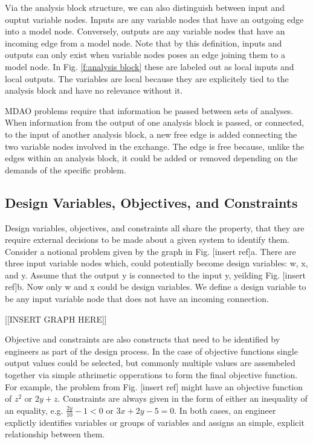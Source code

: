 Via the analysis block structure, we can also distinguish between input and ouptut
variable nodes. Inputs are any variable nodes that have an outgoing edge into a model 
node. Conversely, outputs are any variable nodes that have an incoming edge from a model node. 
Note that by this definition, inputs and outputs can only exist when variable nodes poses an 
edge joining them to a model node. In Fig. \ref{f:analysis block} these are labeled out as 
local inputs and local outputs. The variables are local because they are explicitely tied
to the analysis block and have no relevance without it. 

MDAO problems require that information be passed between sets of analyses. When information from the output of one analysis 
block is passed, or connected, to the input of another analysis block, a new free edge is added 
connecting the two variable nodes involved in the exchange. The edge is free because, unlike the edges 
within an analysis block, it could be added or removed depending on the demands of the specific problem. 

\subsection{Design Variables, Objectives, and Constraints}

Design variables, objectives, and constraints all share the property, that they are 
require external decisions to be made about a given system to identify them. Consider 
a notional problem given by the graph in Fig. [insert ref]a. There are three input variable 
nodes which, could potentially become design variables: w, x, and y. Assume that the 
output y is connected to the input y, yeilding Fig. [insert ref]b. Now only w and x could 
be design variables. We define a design variable to be any input variable node that does 
not have an incoming connection. 

[[INSERT GRAPH HERE]]

Objective and constraints are also constructs that need to be identified by engineers 
as part of the design process. In the case of objective functions single output values 
could be selected, but commonly multiple values are assembeled together via simple 
athrimetic opperations to form the final objective function. For example, the problem from 
Fig. [insert ref] might have an objective function of $z^2$ or $2y + z$. Constraints are 
always given in the form of either an inequality of an equality, e.g. 
$\frac{2y}{10}-1<0$ or $3x+2y - 5=0$. In both cases, an engineer explictly identifies variables 
or groups of variables and assigns an simple, explicit relationship between them. 

